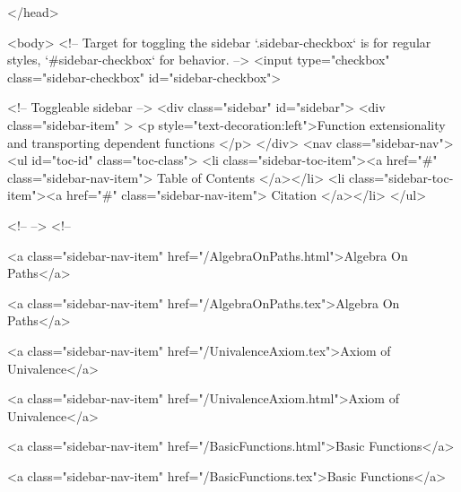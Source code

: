   
</head>




  <body>
    <!-- Target for toggling the sidebar `.sidebar-checkbox` is for regular
     styles, `#sidebar-checkbox` for behavior. -->
<input type="checkbox" class="sidebar-checkbox" id="sidebar-checkbox">

<!-- Toggleable sidebar -->
<div class="sidebar" id="sidebar">
  <div class="sidebar-item" >
    <p style="text-decoration:left">Function extensionality and transporting dependent functions </p>
  </div>
  <nav class="sidebar-nav">
    <ul id="toc-id" class="toc-class">
  <li class="sidebar-toc-item"><a href="#" class="sidebar-nav-item"> Table of Contents </a></li>
  <li class="sidebar-toc-item"><a href="#" class="sidebar-nav-item"> Citation </a></li>
</ul>


    <!--  -->
    <!-- 
      
    
      
    
      
    
      
        
      
    
      
        
          <a class="sidebar-nav-item" href="/AlgebraOnPaths.html">Algebra On Paths</a>
        
      
    
      
        
          <a class="sidebar-nav-item" href="/AlgebraOnPaths.tex">Algebra On Paths</a>
        
      
    
      
        
          <a class="sidebar-nav-item" href="/UnivalenceAxiom.tex">Axiom of Univalence</a>
        
      
    
      
        
          <a class="sidebar-nav-item" href="/UnivalenceAxiom.html">Axiom of Univalence</a>
        
      
    
      
        
          <a class="sidebar-nav-item" href="/BasicFunctions.html">Basic Functions</a>
        
      
    
      
        
          <a class="sidebar-nav-item" href="/BasicFunctions.tex">Basic Functions</a>
        
      
    
